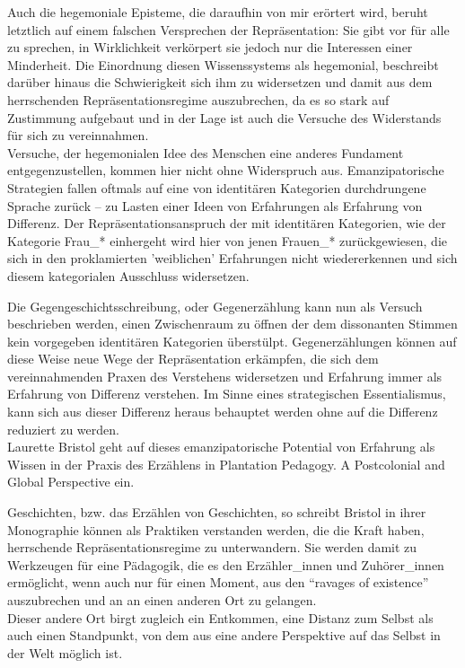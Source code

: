   Auch die hegemoniale Episteme, die daraufhin von
  mir erörtert wird, beruht letztlich auf einem falschen Versprechen der
  Repräsentation: Sie gibt vor für alle zu sprechen,  in Wirklichkeit
  verkörpert sie jedoch nur die Interessen einer Minderheit.  Die Einordnung
  diesen Wissenssystems als hegemonial, beschreibt darüber hinaus die
  Schwierigkeit sich ihm zu widersetzen und damit aus dem herrschenden
  Repräsentationsregime auszubrechen, da es so stark auf  Zustimmung aufgebaut
  und in der Lage ist auch die Versuche des Widerstands für sich zu
  vereinnahmen.
  \\

  Versuche, der hegemonialen Idee des  Menschen eine anderes Fundament
  entgegenzustellen,  kommen hier nicht ohne Widerspruch aus. Emanzipatorische
  Strategien fallen oftmals auf eine von identitären Kategorien durchdrungene
  Sprache zurück – zu Lasten einer Ideen von Erfahrungen als Erfahrung von
  Differenz. Der Repräsentationsanspruch der mit identitären Kategorien, wie
  der Kategorie Frau\_* einhergeht wird hier von jenen Frauen\_* zurückgewiesen,
  die sich in den proklamierten 'weiblichen' Erfahrungen nicht wiedererkennen
  und sich diesem kategorialen Ausschluss widersetzen.

  Die Gegengeschichtsschreibung, oder Gegenerzählung kann nun als Versuch
  beschrieben werden, einen Zwischenraum zu öffnen der dem dissonanten Stimmen
  kein vorgegeben identitären Kategorien überstülpt. Gegenerzählungen  können
  auf diese Weise neue Wege der Repräsentation erkämpfen, die sich dem
  vereinnahmenden Praxen des Verstehens widersetzen und Erfahrung immer als
  Erfahrung von Differenz verstehen. Im Sinne eines strategischen
  Essentialismus, kann sich aus dieser Differenz heraus behauptet werden ohne
  auf die Differenz reduziert zu werden.
  \\
 
  Laurette Bristol geht auf dieses emanzipatorische Potential von Erfahrung als
  Wissen in der Praxis des Erzählens  in  \glqq Plantation Pedagogy. A Postcolonial
  and Global Perspective \grqq\footnotemark {} ein.

  Geschichten, bzw. das Erzählen von Geschichten, so schreibt Bristol in ihrer
  Monographie können als Praktiken verstanden werden, die die Kraft haben,
  herrschende Repräsentationsregime zu unterwandern. Sie werden damit zu
  Werkzeugen für eine Pädagogik, die es den Erzähler\_innen und Zuhörer\_innen
  ermöglicht, wenn auch nur für einen Moment, aus den “ravages of
  existence”\footnotemark {}
  auszubrechen und an an einen anderen Ort zu gelangen. \\
  Dieser andere Ort birgt
  zugleich ein Entkommen, eine Distanz zum Selbst  als auch einen Standpunkt,
  von dem aus eine andere Perspektive auf das Selbst in der Welt möglich ist.\\
  

